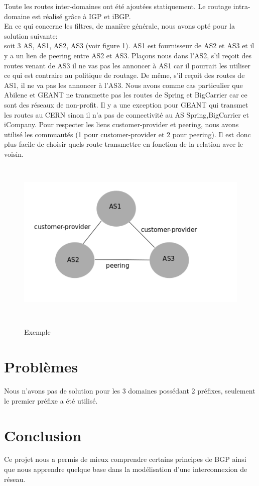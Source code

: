 \documentclass[a4paper,12pt]{report} %
\begin{document}
Toute les routes inter-domaines ont été ajoutées statiquement. Le routage intra-domaine est réalisé grâce à IGP et iBGP.\\

En ce qui concerne les filtres, de manière générale, nous avons opté pour la solution suivante:\\
soit 3 AS, AS1, AS2, AS3 (voir figure \ref{as}). AS1 est fournisseur de AS2 et AS3 et il y a un lien de peering entre AS2 et AS3. Plaçons nous dans l'AS2, s'il reçoit des routes venant de AS3 il ne vas pas les annoncer à AS1 car il pourrait les utiliser ce qui est contraire au politique de routage. De même, s'il reçoit des routes de AS1, il ne va pas les annoncer à l'AS3. Nous avons comme cas particulier que Abilene et GEANT ne transmette pas les routes de Spring et BigCarrier car ce sont des réseaux de non-profit. Il y a une exception pour GEANT qui transmet les routes au CERN sinon il n'a pas de connectivité au AS Spring,BigCarrier et iCompany.
Pour respecter les liens customer-provider et peering, nous avons utilisé les commuautés (1 pour customer-provider et 2 pour peering). Il est donc plus facile de choisir quels route transmettre en fonction de la relation avec le voisin.
\begin{figure}[!h] %
		\centering
		\includegraphics[width=120mm,height=80mm]{as}
		\label{as}
		\caption{Exemple}
	\end{figure} 
	
\section{Problèmes}
Nous n'avons pas de solution pour les 3 domaines possédant 2 préfixes, seulement le premier préfixe a été utilisé.

\section{Conclusion}
Ce projet nous a permis de mieux comprendre certains principes de BGP ainsi que nous apprendre quelque base dans la modélisation d'une interconnexion de réseau.
\end{document}
